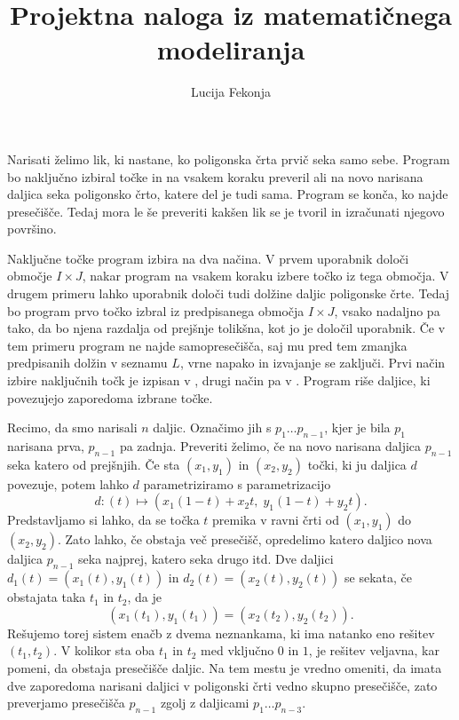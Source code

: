\documentclass{article}
\author{Lucija Fekonja}
\title{Projektna naloga iz matematičnega modeliranja}
\begin{document}
\maketitle

Narisati želimo lik, ki nastane, ko poligonska črta prvič seka samo sebe. 
Program bo naključno izbiral točke 
in na vsakem koraku preveril ali na novo narisana daljica seka poligonsko
črto, katere del je tudi sama. Program se konča, ko najde presečišče. Tedaj 
mora le še preveriti kakšen lik se je tvoril in izračunati njegovo površino.

Naključne točke program izbira na dva načina. V prvem uporabnik določi območje 
$I \times J$, nakar program na vsakem koraku izbere točko iz tega območja. V 
drugem primeru lahko uporabnik določi tudi dolžine daljic poligonske črte. Tedaj 
bo program prvo točko izbral iz predpisanega območja $I\times J$, vsako nadaljno
pa tako, da bo njena razdalja od prejšnje tolikšna, kot jo je določil uporabnik.
Če v tem primeru
program ne najde samopresečišča, saj mu pred tem zmanjka predpisanih dolžin v seznamu 
$L$, vrne napako in izvajanje se zaključi. 
Prvi način izbire 
naključnih točk je izpisan v , drugi način pa v 
. Program  riše daljice, ki povezujejo
zaporedoma izbrane točke.

Recimo, da smo narisali $n$ daljic. Označimo jih s $p_1 \dots p_{n-1}$, kjer je bila $p_1$ narisana 
prva, $p_{n-1}$ pa zadnja. Preveriti želimo, če na novo narisana daljica $p_{n-1}$ seka katero od prejšnjih.
Če sta $(x_1, y_1)$ in $(x_2, y_2)$ točki, ki ju daljica $d$ povezuje, 
potem lahko $d$ parametriziramo s parametrizacijo 
$$ d \colon (t) \mapsto ( x_1 (1 - t) + x_2 t, \; y_1 (1 - t) + y_2 t) \text{.}$$
Predstavljamo si lahko, da se točka $t$ premika v ravni črti od $(x_1, y_1)$ do 
$(x_2, y_2)$. Zato lahko, če obstaja več presečišč, opredelimo katero daljico nova 
daljica $p_{n-1}$ seka najprej, katero seka drugo itd. Dve daljici $d_1(t) = (x_1 (t), y_1 (t))$
in $d_2(t) = (x_2 (t), y_2 (t))$ se sekata, če obstajata taka $t_1$ in $t_2$, 
da je 
\begin{equation} \label{sistem}
    (x_1 (t_1), y_1 (t_1)) = (x_2 (t_2), y_2 (t_2)) \text{.}
\end{equation}
Rešujemo torej sistem
enačb z dvema neznankama, ki ima natanko eno rešitev $(t_1, t_2)$. V kolikor sta oba 
$t_1$ in $t_2$ med vključno $0$ in $1$, je rešitev veljavna, kar pomeni, da obstaja presečišče 
daljic. Na tem mestu je vredno omeniti, da imata dve zaporedoma narisani daljici v poligonski
črti vedno skupno presečišče, zato preverjamo presečišča $p_{n-1}$ zgolj z daljicami $p_1 \dots p_{n-3}$.
\end{document}

